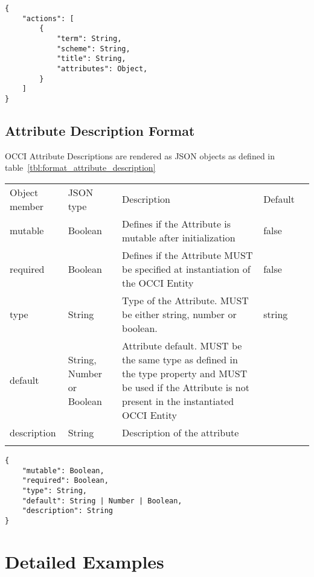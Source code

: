 \documentclass[10pt,a4paper]{article}
\begin{document}
\begin{lstlisting}
{
    "actions": [
        {
            "term": String,
            "scheme": String,
            "title": String,
            "attributes": Object,
        }
    ]
}
\end{lstlisting}

\subsection{Attribute Description Format}
\label{sec:format_attribute_description}

OCCI Attribute Descriptions are rendered as JSON objects as defined in table~\ref{tbl:format_attribute_description}

 {
    \begin{tabularx}{\textwidth}{llXll}
    \toprule
    Object member & JSON type & Description & Default \\
    \colrule
    mutable & Boolean & Defines if the Attribute is mutable after initialization
& false \\
    required & Boolean & Defines if the Attribute MUST be specified at
instantiation of the OCCI Entity & false \\
    type & String & Type of the Attribute. MUST be either string, number or
boolean. & string \\
    default & String, Number or Boolean & Attribute default. MUST be the same
type as defined in the type property and MUST  be used if the Attribute is not
present in the instantiated OCCI Entity & \\
    description & String & Description of the attribute & \\
    \botrule
    \end{tabularx}
}
\begin{lstlisting}
{
    "mutable": Boolean,
    "required": Boolean,
    "type": String,
    "default": String | Number | Boolean,
    "description": String
}
\end{lstlisting}

\section{Detailed Examples}
\label{sec:examples}
\end{document}
